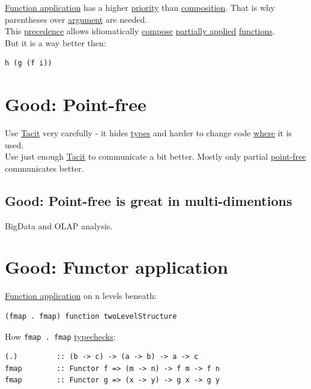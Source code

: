 \documentclass[a4paper,14pt,oneside]{book}
\begin{document}
{\hyperref[orgb781c28]{Function application} has a higher \hyperref[org20a85c3]{priority} than \hyperref[orgd27cab7]{composition}. That is why parentheses over \hyperref[orgdd12744]{argument} are needed.\\
This \hyperref[org578544e]{precedence} allows idiomatically \hyperref[org22ff753]{compose} \hyperref[orgae8108f]{partially applied} \hyperref[orgf33f5fb]{functions}.\\

But it is a way better then:\\
\begin{verbatim}
h (g (f i))
\end{verbatim}

\chapter{\label{org5794770}Good: Point-free}
\label{sec:org621b934}
Use \hyperref[orgb8532fd]{Tacit} very carefully - it hides \hyperref[org51532d9]{types} and harder to change code \hyperref[org5b6b021]{where} it is used.\\
Use just enough \hyperref[orgb8532fd]{Tacit} to communicate a bit better. Mostly only partial \hyperref[org07a91d6]{point-free} communicates better.\\

\section{\label{org1c8ae53}Good: Point-free is great in multi-dimentions}
\label{sec:orga7bc1de}
BigData and OLAP analysis.\\

\chapter{\label{org11172a6}Good: Functor application}
\label{sec:org432e5b3}
\hyperref[orgb781c28]{Function application} on n levels beneath:\\
\begin{verbatim}
(fmap . fmap) function twoLevelStructure
\end{verbatim}

How \texttt{fmap . fmap} \hyperref[orgf4819ea]{typechecks}:\\
\begin{verbatim}
(.)         :: (b -> c) -> (a -> b) -> a -> c
fmap        :: Functor f => (m -> n) -> f m -> f n
fmap        :: Functor g => (x -> y) -> g x -> g y


\end{verbatim}}
\end{document}
